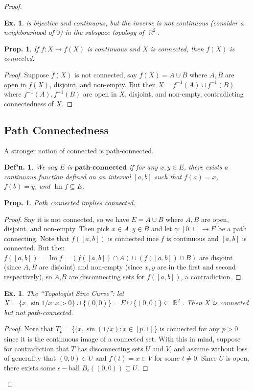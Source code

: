 \documentclass[12pt, a4paper]{book}
\DeclareMathOperator{\R}{\mathbb{R}}
\DeclareMathOperator{\Im}{Im}
\newtheorem{definition}[theorem]{Def'n.}
\newtheorem{proposition}[theorem]{Prop.}
\newtheorem{example}[theorem]{Ex.}
\theoremstyle{nonumberplain}
\newtheorem{proof}{Proof}
\begin{document}
\begin{proof}
\begin{example}
    is bijective and continuous, but the inverse is not continuous (consider a neighbourhood of $0$) in the subspace
    topology of $\R^2$.
\end{example}
\begin{proposition}
    If $f:X\to f(X)$ is continuous and $X$ is connected, then $f(X)$ is connected.
\end{proposition}
\begin{proof}
    Suppose $f(X)$ is not connected, say $f(X)=A\cup B$ where $A,B$ are open in $f(X)$, disjoint, and non-empty. But
    then $X=f^{-1}(A)\cup f^{-1}(B)$ where $f^{-1}(A),f^{-1}(B)$ are open in $X$, disjoint, and non-empty, contradicting
    connectedness of $X$.
\end{proof}
\subsection{Path Connectedness}
A stronger notion of connected is path-connected.
\begin{definition}
    We say $E$ is $\textbf{path-connected}$ if for any $x,y\in E$, there exists a continuous function defined on an interval
    $[a,b]$ such that $f(a)=x$, $f(b)=y$, and $\Im f\subseteq E$.
\end{definition}
\begin{proposition}
    Path connected implies connected.
\end{proposition}
\begin{proof}
    Say it is not connected, so we have $E=A\cup B$ where $A,B$ are open, disjoint, and non-empty. Then pick
    $x\in A,y\in B$ and let $\gamma:[0,1]\to E$ be a path connecting. Note that $f([a,b])$ is connected ince
    $f$ is continuous and $[a,b]$ is connected. But then $f([a,b])=\Im f=(f([a,b])\cap A)\cup(f([a,b])\cap B)$ are disjoint
    (since $A,B$ are disjoint) and non-empty (since $x,y$ are in the first and second respectively), so
    $A$,$B$ are disconnecting sets for $f([a,b])$, a contradiction.
\end{proof}
\begin{example}
    The ``Topologist Sine Curve'': let $X=\{x,\sin 1/x:x>0\}\cup\{(0,0)\}=E\cup\{(0,0)\}\subseteq\R^2$. Then $X$ is connected
    but not path-connected.
\end{example}
\begin{proof}
    Note that $T_p=\{(x,\sin(1/x):x\in[p,1]\}$ is connected for any $p>0$ since it is the continuous image
    of a connected set. With this in mind, suppose for contradiction that $T$ has disconnecting sets
    $U$ and $V$, and assume without loss of generality that $(0,0)\in U$ and $f(t)=x\in V$ for some $t\neq 0$.
    Since $U$ is open, there exists some $\epsilon-$ball $B_\epsilon\left( (0,0) \right)\subseteq U$.


\end{proof}
\end{proof}
\end{document}
